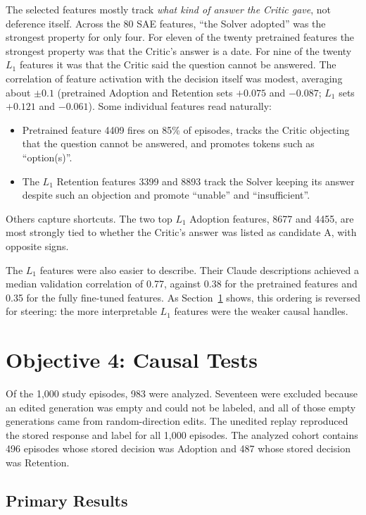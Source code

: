 The selected features mostly track \emph{what kind of answer the Critic gave},
not deference itself. Across the 80 SAE features, ``the Solver adopted'' was
the strongest property for only four. For eleven of the twenty pretrained
features the strongest property was that the Critic's answer is a date. For
nine of the twenty $L_1$ features it was that the Critic said the question
cannot be answered. The correlation of feature activation with the decision
itself was modest, averaging about $\pm0.1$ (pretrained Adoption and
Retention sets $+0.075$ and $-0.087$; $L_1$ sets $+0.121$ and $-0.061$).
Some individual features read naturally:
\begin{itemize}[nosep]
    \item Pretrained feature 4409 fires on 85\% of episodes, tracks the Critic
    objecting that the question cannot be answered, and promotes tokens such as
    ``option(s)''.
    \item The $L_1$ Retention features 3399 and 8893 track the Solver keeping
    its answer despite such an objection and promote ``unable'' and
    ``insufficient''.
\end{itemize}
Others capture shortcuts. The two top $L_1$ Adoption features, 8677 and 4455,
are most strongly tied to whether the Critic's answer was listed as candidate
A, with opposite signs.

The $L_1$ features were also easier to describe. Their Claude descriptions
achieved a median validation correlation of 0.77, against 0.38 for the
pretrained features and 0.35 for the fully fine-tuned features. As
Section~\ref{sec:res-causal} shows, this ordering is reversed for steering:
the more interpretable $L_1$ features were the weaker causal handles.

\section{Objective 4: Causal Tests}
\label{sec:res-causal}

Of the 1,000 study episodes, 983 were analyzed. Seventeen were excluded
because an edited generation was empty and could not be labeled, and all of
those empty generations came from random-direction edits. The unedited replay
reproduced the stored response and label for all 1,000 episodes. The analyzed
cohort contains 496 episodes whose stored decision was Adoption and 487 whose
stored decision was Retention.

\subsection{Primary Results}

